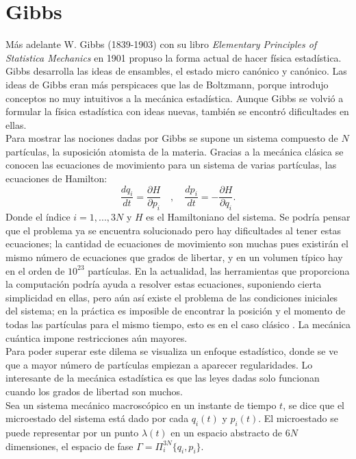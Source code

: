 \section{Gibbs}
Más adelante W. Gibbs (1839-1903) con su libro \textit{Elementary Principles of Statistica Mechanics} en 1901 propuso la forma actual de hacer física estadística. Gibbs desarrolla las ideas de ensambles, el estado micro canónico y canónico. Las ideas de Gibbs eran más perspicaces que las de Boltzmann, porque introdujo conceptos no muy intuitivos a la mecánica estadística. Aunque Gibbs se volvió a formular la física estadística con ideas nuevas, también se encontró dificultades en ellas. \\
Para mostrar las nociones dadas por Gibbs se supone un sistema compuesto de $N$ partículas, la suposición atomista de la materia. Gracias a la mecánica clásica se conocen las ecuaciones de movimiento para un sistema de varias partículas, las ecuaciones de Hamilton:
\begin{equation} \label{Hamilton}
\frac{dq_{i}}{dt}= \frac{\partial H}{\partial p_{i}} \quad , \quad \frac{d p_{i}}{dt} =-\frac{\partial H}{\partial q_{i}}.
\end{equation}
Donde el índice $i=1,...,3N$ y $H$ es el Hamiltoniano del sistema. Se podría pensar que el problema ya se encuentra solucionado pero hay dificultades al tener estas ecuaciones; la cantidad de ecuaciones de movimiento son muchas pues existirán el mismo número de ecuaciones que grados de libertar, y en un volumen típico hay en el orden de $10^{23}$ partículas. En la actualidad, las herramientas que proporciona la computación podría ayuda a resolver estas ecuaciones, suponiendo cierta simplicidad en ellas, pero aún así existe el problema de las condiciones iniciales del sistema; en la práctica es imposible de encontrar la posición y el momento de todas las partículas para el mismo tiempo, esto es en el caso clásico \cite{LandauStat}. La mecánica cuántica impone restricciones aún mayores.
\\
Para poder superar este dilema se visualiza un enfoque estadístico, donde se ve que a mayor número de partículas empiezan a aparecer regularidades. Lo interesante de la mecánica estadística es que las leyes dadas solo funcionan cuando los grados de libertad son muchos.
\\
Sea un sistema mecánico macroscópico en un instante de tiempo $t$,  se dice que el microestado del sistema está dado por cada $q_{i}(t)$ y $p_{i}(t)$. El microestado se puede representar por un punto $\lambda(t)$ en un espacio  abstracto de $6N$ dimensiones, el espacio de fase $\Gamma = \Pi^{3N}_{i} \{q_{i}, p_{i} \}$.
